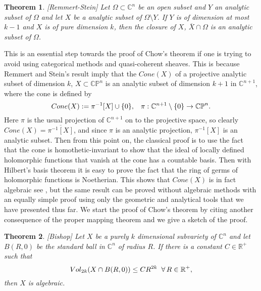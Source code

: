 \documentclass[letterpaper]{book}
\newtheorem{theorem}{Theorem}[section]
\newcommand{\co}{\ensuremath{\mathbb C }}
\newcommand{\con}{\ensuremath{\mathbb{C}^n}}
\newcommand{\cp}{\ensuremath{\mathbb{CP}}}
\newcommand{\re}{\ensuremath{\mathbb R }}
\begin{document}
\begin{theorem}\label{Rem-Stein}[Remmert-Stein]
        Let $\Omega\subset\con$ be an open subset and $Y$ an analytic subset
        of $\Omega$ and let $X$ be a analytic subset of
        $\Omega\setminus Y$. If $Y$ is of dimension at most $k-1$ and $X$ is of pure dimension $k$,
        then the closure of $X$, $\overline{X}\cap\Omega$ is an analytic subset of $\Omega$.
\end{theorem}
This is an essential step towards the proof of Chow's theorem if one is trying to avoid using categorical methods and
quasi-coherent sheaves. This is because Remmert and Stein's result imply that the $Cone(X)$ of a projective analytic
subset of dimension $k$, $X\subset\cp^n$ is an analytic subset of dimension $k+1$ in $\co^{n+1}$, where the cone is defined by
\begin{equation}
Cone(X):=\pi^{-1}[X]\cup\lbrace0\rbrace,\hspace{0.3cm}\pi:\co^{n+1}\setminus\lbrace 0\rbrace\rightarrow\cp^n.
\end{equation}
\noindent Here $\pi$ is the usual projection of $\co^{n+1}$ on to the
projective space, so clearly $Cone(X)=\overline{\pi^{-1}[X]}$, and since $\pi$
is an analytic projection, $\pi^{-1}[X]$ is an analytic subset. Then from this
point on, the classical proof is to use the fact that the cone is homothetic-invariant to
show that the ideal of locally defined holomorphic functions that vanish at the
cone has a countable basis. Then with Hilbert's basis theorem it is easy to prove the
fact that the ring of germs of holomorphic functions is Noetherian. This shows
that $Cone(X)$ is in fact algebraic see \cite{Chirka}, but the same result can
be proved without algebraic methods with an equally simple proof using only
the geometric and analytical tools that we have presented thus far.  We start
the proof of Chow's theorem by citing another consequence of the proper mapping
theorem and we give a sketch of the proof.
\begin{theorem}\label{bishop}[Bishop]
        Let $X$ be a purely $k$ dimensional subvariety of $\con$ and
        let $B(R,0)$ be the standard ball in $\con$ of
        radius $R$. If there is  a constant $C\in\re^{+}$ such that
        \begin{equation}
                Vol_{2k}(X\cap B(R,0))\leq CR^{2k} \hspace*{0.2cm}\forall\, R\in\re^{+},
        \end{equation} then $X$ is algebraic.
\end{theorem}
\end{document}
